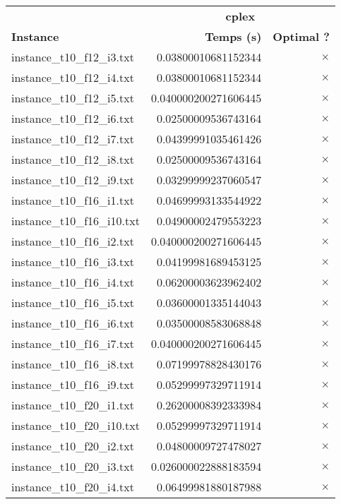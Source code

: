 \documentclass{article}
\begin{document}
\begin{center}
\renewcommand{\arraystretch}{1.4}
\begin{tabular}{|l|rr|}
\hline
 & \multicolumn{2}{c|}{\textbf{cplex}}\\
\textbf{Instance} & \textbf{Temps (s)} & \textbf{Optimal ?} \\\hline
instance\_t10\_f12\_i3.txt & 0.03800010681152344 & $\times$ \\
instance\_t10\_f12\_i4.txt & 0.03800010681152344 & $\times$ \\
instance\_t10\_f12\_i5.txt & 0.040000200271606445 & $\times$ \\
instance\_t10\_f12\_i6.txt & 0.02500009536743164 & $\times$ \\
instance\_t10\_f12\_i7.txt & 0.04399991035461426 & $\times$ \\
instance\_t10\_f12\_i8.txt & 0.02500009536743164 & $\times$ \\
instance\_t10\_f12\_i9.txt & 0.03299999237060547 & $\times$ \\
instance\_t10\_f16\_i1.txt & 0.04699993133544922 & $\times$ \\
instance\_t10\_f16\_i10.txt & 0.04900002479553223 & $\times$ \\
instance\_t10\_f16\_i2.txt & 0.040000200271606445 & $\times$ \\
instance\_t10\_f16\_i3.txt & 0.04199981689453125 & $\times$ \\
instance\_t10\_f16\_i4.txt & 0.06200003623962402 & $\times$ \\
instance\_t10\_f16\_i5.txt & 0.03600001335144043 & $\times$ \\
instance\_t10\_f16\_i6.txt & 0.03500008583068848 & $\times$ \\
instance\_t10\_f16\_i7.txt & 0.040000200271606445 & $\times$ \\
instance\_t10\_f16\_i8.txt & 0.07199978828430176 & $\times$ \\
instance\_t10\_f16\_i9.txt & 0.05299997329711914 & $\times$ \\
instance\_t10\_f20\_i1.txt & 0.26200008392333984 & $\times$ \\
instance\_t10\_f20\_i10.txt & 0.05299997329711914 & $\times$ \\
instance\_t10\_f20\_i2.txt & 0.04800009727478027 & $\times$ \\
instance\_t10\_f20\_i3.txt & 0.026000022888183594 & $\times$ \\
instance\_t10\_f20\_i4.txt & 0.06499981880187988 & $\times$ \\

\end{tabular}
\end{center}
\end{document}
